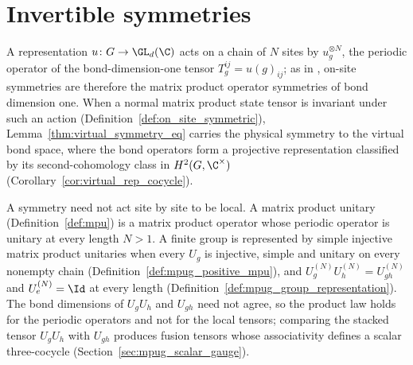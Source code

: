 
\section{Invertible symmetries}%
\label{sec:mposym_invertible}

\begin{remark}%
    \label{rem:mposym_onsite}
    A representation $u\colon G\to\GL_d(\C)$ acts on a chain of $N$ sites by
    $u_g^{\otimes N}$, the periodic operator of the bond-dimension-one tensor
    $T_g^{ij}=u(g)_{ij}$; as in \cite[Section~4]{GarreRubio2023MPOSym},
    on-site symmetries are therefore the matrix product operator symmetries
    of bond dimension one. When a normal matrix product state tensor is
    invariant under such an action (Definition~\ref{def:on_site_symmetric}),
    Lemma~\ref{thm:virtual_symmetry_eq} carries the physical symmetry to
    the virtual bond space, where the bond operators form a projective
    representation classified by its second-cohomology class in
    $H^2(G,\C^\times)$ (Corollary~\ref{cor:virtual_rep_cocycle}).
\end{remark}

\begin{remark}%
    \label{rem:mposym_mpu_groups}
    A symmetry need not act site by site to be local. A matrix product
    unitary (Definition~\ref{def:mpu}) is a matrix product operator whose
    periodic operator is unitary at every length $N>1$. A finite group is
    represented by simple injective matrix product unitaries when every
    $U_g$ is injective, simple and unitary on every nonempty chain
    (Definition~\ref{def:mpug_positive_mpu}), and
    $U_g^{(N)}U_h^{(N)}=U_{gh}^{(N)}$ and $U_e^{(N)}=\Id$ at every length
    (Definition~\ref{def:mpug_group_representation}). The bond dimensions of
    $U_gU_h$ and $U_{gh}$ need not agree, so the product law holds for the
    periodic operators and not for the local tensors; comparing the stacked
    tensor $U_gU_h$ with $U_{gh}$ produces fusion tensors whose associativity
    defines a scalar three-cocycle
    (Section~\ref{sec:mpug_scalar_gauge}).
\end{remark}


